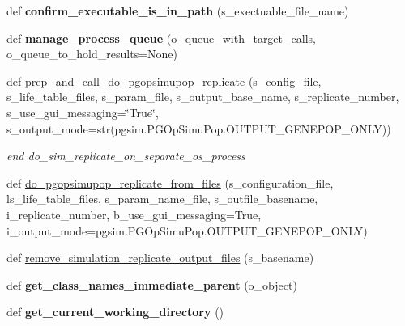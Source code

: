 \begin{DoxyCompactItemize}
\item 
def {\bfseries confirm\+\_\+executable\+\_\+is\+\_\+in\+\_\+path} (s\+\_\+exectuable\+\_\+file\+\_\+name)\hypertarget{namespacenegui_1_1pgutilities_a8fe3f14ed21663af6196c0c53349c536}{}\label{namespacenegui_1_1pgutilities_a8fe3f14ed21663af6196c0c53349c536}

\item 
def {\bfseries manage\+\_\+process\+\_\+queue} (o\+\_\+queue\+\_\+with\+\_\+target\+\_\+calls, o\+\_\+queue\+\_\+to\+\_\+hold\+\_\+results=None)\hypertarget{namespacenegui_1_1pgutilities_a2096f66a8484e74902fb97c787c79345}{}\label{namespacenegui_1_1pgutilities_a2096f66a8484e74902fb97c787c79345}

\item 
def \hyperlink{namespacenegui_1_1pgutilities_aec3b74a55914681d88a8b938b3220ff0}{prep\+\_\+and\+\_\+call\+\_\+do\+\_\+pgopsimupop\+\_\+replicate} (s\+\_\+config\+\_\+file, s\+\_\+life\+\_\+table\+\_\+files, s\+\_\+param\+\_\+file, s\+\_\+output\+\_\+base\+\_\+name, s\+\_\+replicate\+\_\+number, s\+\_\+use\+\_\+gui\+\_\+messaging=\char`\"{}True\char`\"{}, s\+\_\+output\+\_\+mode=str(pgsim.\+P\+G\+Op\+Simu\+Pop.\+O\+U\+T\+P\+U\+T\+\_\+\+G\+E\+N\+E\+P\+O\+P\+\_\+\+O\+N\+LY))
\begin{DoxyCompactList}\small\item\em end do\+\_\+sim\+\_\+replicate\+\_\+on\+\_\+separate\+\_\+os\+\_\+process \end{DoxyCompactList}\item 
def \hyperlink{namespacenegui_1_1pgutilities_aa80fcb5144db7e03186d7496ab1de393}{do\+\_\+pgopsimupop\+\_\+replicate\+\_\+from\+\_\+files} (s\+\_\+configuration\+\_\+file, ls\+\_\+life\+\_\+table\+\_\+files, s\+\_\+param\+\_\+name\+\_\+file, s\+\_\+outfile\+\_\+basename, i\+\_\+replicate\+\_\+number, b\+\_\+use\+\_\+gui\+\_\+messaging=True, i\+\_\+output\+\_\+mode=pgsim.\+P\+G\+Op\+Simu\+Pop.\+O\+U\+T\+P\+U\+T\+\_\+\+G\+E\+N\+E\+P\+O\+P\+\_\+\+O\+N\+LY)
\item 
def \hyperlink{namespacenegui_1_1pgutilities_aa37c7d125e4eaec2eeea639f53fa140d}{remove\+\_\+simulation\+\_\+replicate\+\_\+output\+\_\+files} (s\+\_\+basename)
\item 
def {\bfseries get\+\_\+class\+\_\+names\+\_\+immediate\+\_\+parent} (o\+\_\+object)\hypertarget{namespacenegui_1_1pgutilities_a6ab2e254a7954f6a3ad216cbbb18436c}{}\label{namespacenegui_1_1pgutilities_a6ab2e254a7954f6a3ad216cbbb18436c}

\item 
def {\bfseries get\+\_\+current\+\_\+working\+\_\+directory} ()\hypertarget{namespacenegui_1_1pgutilities_ada6bbd0893b0b9ecea89245329058e30}{}\label{namespacenegui_1_1pgutilities_ada6bbd0893b0b9ecea89245329058e30}


\end{DoxyCompactItemize}
